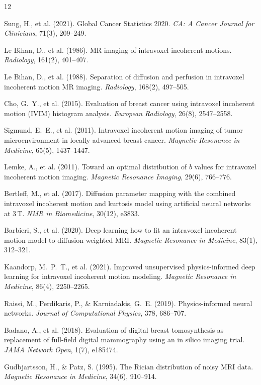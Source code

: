 \documentclass[12pt]{article}
\begin{document}
\begin{thebibliography}{12}

Sung, H., et al. (2021).
Global Cancer Statistics 2020.
\textit{CA: A Cancer Journal for Clinicians}, 71(3), 209--249.

Le Bihan, D., et al. (1986).
MR imaging of intravoxel incoherent motions.
\textit{Radiology}, 161(2), 401--407.

Le Bihan, D., et al. (1988).
Separation of diffusion and perfusion in intravoxel incoherent motion MR imaging.
\textit{Radiology}, 168(2), 497--505.

Cho, G.~Y., et al. (2015).
Evaluation of breast cancer using intravoxel incoherent motion (IVIM) histogram analysis.
\textit{European Radiology}, 26(8), 2547--2558.

Sigmund, E.~E., et al. (2011).
Intravoxel incoherent motion imaging of tumor microenvironment in locally advanced breast cancer.
\textit{Magnetic Resonance in Medicine}, 65(5), 1437--1447.

Lemke, A., et al. (2011).
Toward an optimal distribution of $b$ values for intravoxel incoherent motion imaging.
\textit{Magnetic Resonance Imaging}, 29(6), 766--776.

Bertleff, M., et al. (2017).
Diffusion parameter mapping with the combined intravoxel incoherent motion and kurtosis model using artificial neural networks at 3\,T.
\textit{NMR in Biomedicine}, 30(12), e3833.

Barbieri, S., et al. (2020).
Deep learning how to fit an intravoxel incoherent motion model to diffusion-weighted MRI.
\textit{Magnetic Resonance in Medicine}, 83(1), 312--321.

Kaandorp, M.~P.~T., et al. (2021).
Improved unsupervised physics-informed deep learning for intravoxel incoherent motion modeling.
\textit{Magnetic Resonance in Medicine}, 86(4), 2250--2265.

Raissi, M., Perdikaris, P., \& Karniadakis, G.~E. (2019).
Physics-informed neural networks.
\textit{Journal of Computational Physics}, 378, 686--707.

Badano, A., et al. (2018).
Evaluation of digital breast tomosynthesis as replacement of full-field digital mammography using an in silico imaging trial.
\textit{JAMA Network Open}, 1(7), e185474.

Gudbjartsson, H., \& Patz, S. (1995).
The Rician distribution of noisy MRI data.
\textit{Magnetic Resonance in Medicine}, 34(6), 910--914.

\end{thebibliography}
\end{document}
